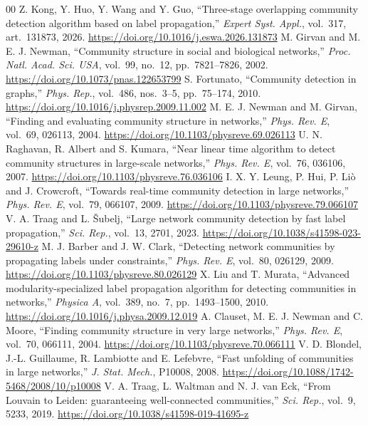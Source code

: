\documentclass[conference]{IEEEtran}
\begin{document}
\begin{thebibliography}{00}
 Z. Kong, Y. Huo, Y. Wang and Y. Guo, ``Three-stage overlapping community detection algorithm based on label propagation,'' \emph{Expert Syst. Appl.}, vol.~317, art.~131873, 2026. \url{https://doi.org/10.1016/j.eswa.2026.131873}
 M. Girvan and M. E. J. Newman, ``Community structure in social and biological networks,'' \emph{Proc. Natl. Acad. Sci. USA}, vol.~99, no.~12, pp.~7821--7826, 2002. \url{https://doi.org/10.1073/pnas.122653799}
 S. Fortunato, ``Community detection in graphs,'' \emph{Phys. Rep.}, vol.~486, nos.~3--5, pp.~75--174, 2010. \url{https://doi.org/10.1016/j.physrep.2009.11.002}
 M. E. J. Newman and M. Girvan, ``Finding and evaluating community structure in networks,'' \emph{Phys. Rev. E}, vol.~69, 026113, 2004. \url{https://doi.org/10.1103/physreve.69.026113}
 U. N. Raghavan, R. Albert and S. Kumara, ``Near linear time algorithm to detect community structures in large-scale networks,'' \emph{Phys. Rev. E}, vol.~76, 036106, 2007. \url{https://doi.org/10.1103/physreve.76.036106}
 I. X. Y. Leung, P. Hui, P. Li\`o and J. Crowcroft, ``Towards real-time community detection in large networks,'' \emph{Phys. Rev. E}, vol.~79, 066107, 2009. \url{https://doi.org/10.1103/physreve.79.066107}
 V. A. Traag and L. \v{S}ubelj, ``Large network community detection by fast label propagation,'' \emph{Sci. Rep.}, vol.~13, 2701, 2023. \url{https://doi.org/10.1038/s41598-023-29610-z}
 M. J. Barber and J. W. Clark, ``Detecting network communities by propagating labels under constraints,'' \emph{Phys. Rev. E}, vol.~80, 026129, 2009. \url{https://doi.org/10.1103/physreve.80.026129}
 X. Liu and T. Murata, ``Advanced modularity-specialized label propagation algorithm for detecting communities in networks,'' \emph{Physica A}, vol.~389, no.~7, pp.~1493--1500, 2010. \url{https://doi.org/10.1016/j.physa.2009.12.019}
 A. Clauset, M. E. J. Newman and C. Moore, ``Finding community structure in very large networks,'' \emph{Phys. Rev. E}, vol.~70, 066111, 2004. \url{https://doi.org/10.1103/physreve.70.066111}
 V. D. Blondel, J.-L. Guillaume, R. Lambiotte and E. Lefebvre, ``Fast unfolding of communities in large networks,'' \emph{J. Stat. Mech.}, P10008, 2008. \url{https://doi.org/10.1088/1742-5468/2008/10/p10008}
 V. A. Traag, L. Waltman and N. J. van Eck, ``From Louvain to Leiden: guaranteeing well-connected communities,'' \emph{Sci. Rep.}, vol.~9, 5233, 2019. \url{https://doi.org/10.1038/s41598-019-41695-z}

\end{thebibliography}
\end{document}
